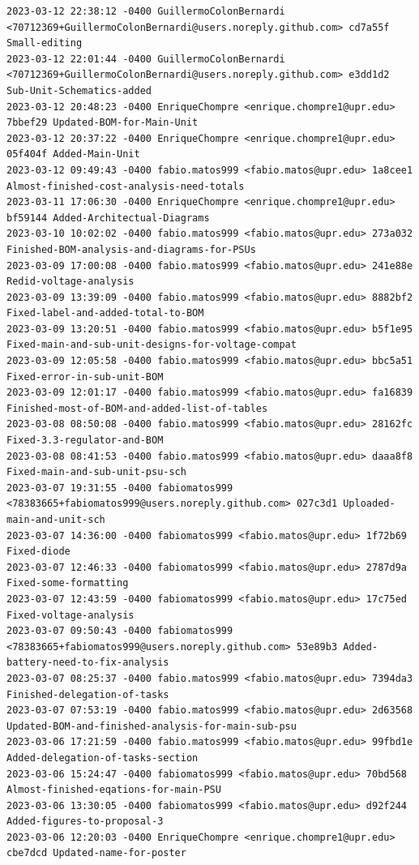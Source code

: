 \documentclass[12pt]{article}
\begin{document}
\begin{verbatim}
2023-03-12 22:38:12 -0400 GuillermoColonBernardi <70712369+GuillermoColonBernardi@users.noreply.github.com> cd7a55f Small-editing
2023-03-12 22:01:44 -0400 GuillermoColonBernardi <70712369+GuillermoColonBernardi@users.noreply.github.com> e3dd1d2 Sub-Unit-Schematics-added
2023-03-12 20:48:23 -0400 EnriqueChompre <enrique.chompre1@upr.edu> 7bbef29 Updated-BOM-for-Main-Unit
2023-03-12 20:37:22 -0400 EnriqueChompre <enrique.chompre1@upr.edu> 05f404f Added-Main-Unit
2023-03-12 09:49:43 -0400 fabio.matos999 <fabio.matos@upr.edu> 1a8cee1 Almost-finished-cost-analysis-need-totals
2023-03-11 17:06:30 -0400 EnriqueChompre <enrique.chompre1@upr.edu> bf59144 Added-Architectual-Diagrams
2023-03-10 10:02:02 -0400 fabio.matos999 <fabio.matos@upr.edu> 273a032 Finished-BOM-analysis-and-diagrams-for-PSUs
2023-03-09 17:00:08 -0400 fabio.matos999 <fabio.matos@upr.edu> 241e88e Redid-voltage-analysis
2023-03-09 13:39:09 -0400 fabio.matos999 <fabio.matos@upr.edu> 8882bf2 Fixed-label-and-added-total-to-BOM
2023-03-09 13:20:51 -0400 fabio.matos999 <fabio.matos@upr.edu> b5f1e95 Fixed-main-and-sub-unit-designs-for-voltage-compat
2023-03-09 12:05:58 -0400 fabio.matos999 <fabio.matos@upr.edu> bbc5a51 Fixed-error-in-sub-unit-BOM
2023-03-09 12:01:17 -0400 fabio.matos999 <fabio.matos@upr.edu> fa16839 Finished-most-of-BOM-and-added-list-of-tables
2023-03-08 08:50:08 -0400 fabio.matos999 <fabio.matos@upr.edu> 28162fc Fixed-3.3-regulator-and-BOM
2023-03-08 08:41:53 -0400 fabio.matos999 <fabio.matos@upr.edu> daaa8f8 Fixed-main-and-sub-unit-psu-sch
2023-03-07 19:31:55 -0400 fabiomatos999 <78383665+fabiomatos999@users.noreply.github.com> 027c3d1 Uploaded-main-and-unit-sch
2023-03-07 14:36:00 -0400 fabiomatos999 <fabio.matos@upr.edu> 1f72b69 Fixed-diode
2023-03-07 12:46:33 -0400 fabiomatos999 <fabio.matos@upr.edu> 2787d9a Fixed-some-formatting
2023-03-07 12:43:59 -0400 fabiomatos999 <fabio.matos@upr.edu> 17c75ed Fixed-voltage-analysis
2023-03-07 09:50:43 -0400 fabiomatos999 <78383665+fabiomatos999@users.noreply.github.com> 53e89b3 Added-battery-need-to-fix-analysis
2023-03-07 08:25:37 -0400 fabio.matos999 <fabio.matos@upr.edu> 7394da3 Finished-delegation-of-tasks
2023-03-07 07:53:19 -0400 fabio.matos999 <fabio.matos@upr.edu> 2d63568 Updated-BOM-and-finished-analysis-for-main-sub-psu
2023-03-06 17:21:59 -0400 fabio.matos999 <fabio.matos@upr.edu> 99fbd1e Added-delegation-of-tasks-section
2023-03-06 15:24:47 -0400 fabiomatos999 <fabio.matos@upr.edu> 70bd568 Almost-finished-eqations-for-main-PSU
2023-03-06 13:30:05 -0400 fabiomatos999 <fabio.matos@upr.edu> d92f244 Added-figures-to-proposal-3
2023-03-06 12:20:03 -0400 EnriqueChompre <enrique.chompre1@upr.edu> cbe7dcd Updated-name-for-poster

\end{verbatim}
\end{document}
